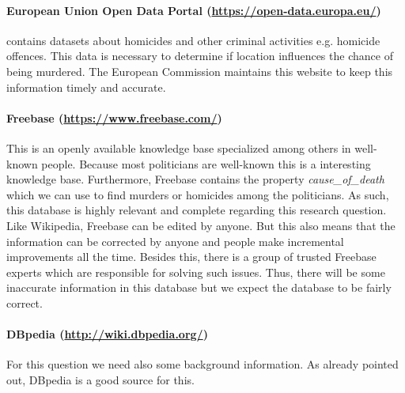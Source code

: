 \documentclass[12pt,a4paper]{article}
\begin{document}
\paragraph{\textbf{European Union Open Data Portal} (\url{https://open-data.europa.eu/})} contains datasets about homicides and other criminal activities e.g. homicide offences. This data is necessary to determine if location influences the chance of being murdered. The European Commission maintains this website to keep this information timely and accurate.


\paragraph{\textbf{Freebase} (\url{https://www.freebase.com/})} This is an openly available knowledge base specialized among others in well-known people. Because most politicians are well-known this is a interesting knowledge base. Furthermore, Freebase contains the property \textit{cause\_of\_death} which we can use to find murders or homicides among the politicians. As such, this database is highly relevant and complete regarding this research question. Like Wikipedia, Freebase can be edited by anyone. But this also means that the information can be corrected by anyone and people make incremental improvements all the time. Besides this, there is a group of trusted Freebase experts which are responsible for solving such issues. Thus, there will be some inaccurate information in this database but we expect the database to be fairly correct. 


\paragraph{\textbf{DBpedia} (\url{http://wiki.dbpedia.org/})}
For this question we need also some background information. As already pointed out, DBpedia is a good source for this.
\end{document}
